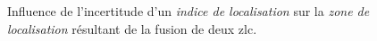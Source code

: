 \begin{figure}
  \centering
  \subfloat[]{}

  \subfloat[]{}
  \caption{Influence de l'incertitude d'un \emph{indice de
      localisation} sur la \emph{zone de localisation} résultant de la
    fusion de deux \ac{zlc}.}
  \label{fig:intersection}
\end{figure}



